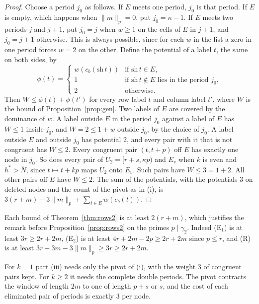 \documentclass[11pt]{amsart}
\theoremstyle{definition}
\theoremstyle{remark}
\numberwithin{equation}{section}
\begin{document}
\begin{proof}
Choose a period $j_0$ as follows. If $E$ meets one period, $j_0$ is that period. If $E$ is empty, which
happens when $\|m\|_p=0$, put $j_0=\kappa-1$. If $E$ meets two periods $j$ and $j+1$, put $j_0=j$ when
$w\ge1$ on the cells of $E$ in $j+1$, and $j_0=j+1$ otherwise. This is always possible, since for each
$w$ in the list a zero in one period forces $w=2$ on the other. Define the potential of a label $t$, the
same on both sides, by
\[
 \phi(t)=\begin{cases}w(c_b(\mathrm{sh}\,t))&\text{if }\mathrm{sh}\,t\in E,\\ 1&\text{if }\mathrm{sh}\,t\notin
 E\text{ lies in the period }j_0,\\ 2&\text{otherwise.}\end{cases}
\]
Then $W\le\phi(t)+\phi(t')$ for every row label $t$ and column label $t'$, where $W$ is the bound of
Proposition~\ref{prop:gen}. Two labels of $E$ are covered by the dominance of $w$. A label outside
$E$ in the period $j_0$ against a label of $E$ has $W\le1$ inside $j_0$, and $W=2\le1+w$
outside $j_0$, by the choice of $j_0$. A label outside $E$ and outside $j_0$ has potential $2$, and every pair
with it that is not congruent has $W\le2$. Every congruent pair $(t,t+p)$ off $E$ has exactly one node in $j_0$.
So does every pair of $U_2=[r+s,\kappa p)$ and $E_v$ when $k$ is even and $h^*>\bar N$, since
$t\mapsto t+kp$ maps $U_2$ onto $E_v$. Such pairs have $W\le3=1+2$. All other pairs off
$E$ have $W\le2$. The sum of the potentials, with the potentials $3$ on deleted nodes and the count of the pivot
as in (i), is $3(r+m)-3\|m\|_p+\sum_{t\in E}w(c_b(t))$.
\end{proof}

Each bound of Theorem~\ref{thm:rows2} is at least $2(r+m)$, which justifies the remark before
Proposition~\ref{prop:rows2} on the primes $p\mid\gamma_2$. Indeed (E$_1$) is at least $3r\ge2r+2m$, (E$_2$) is at
least $4r+2m-2p\ge2r+2m$ since $p\le r$, and (R) is at least $3r+3m-3\|m\|_p\ge3r\ge2r+2m$.

For $k=1$ part (iii) needs only the pivot of (i), with the weight $3$ of congruent pairs kept. For $k\ge2$ it needs the
complete double periods. The pivot contracts the window of length $2m$ to one of length $p+s$ or $s$, and the
cost of each eliminated pair of periods is exactly $3$ per node.
\end{document}
